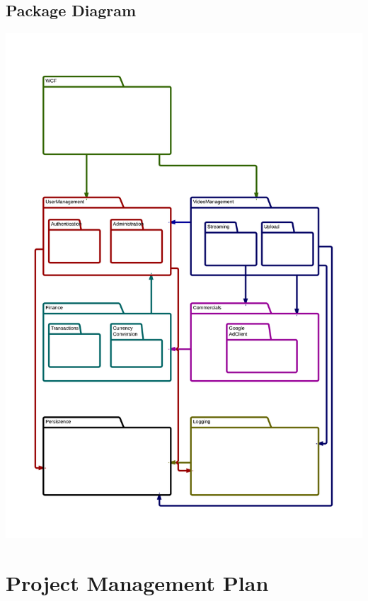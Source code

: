 \subsection{Package Diagram}
\begin{center}
\includegraphics[scale=0.15]{PackageDiagram.png}
\end{center}
\section{Project Management Plan}
